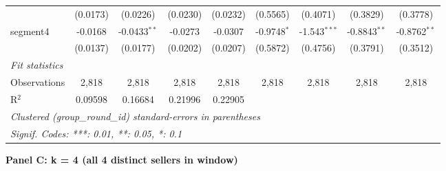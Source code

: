 \begin{tabular}{lcccccccc}
                                    & (0.0173)        & (0.0226)        & (0.0230)        & (0.0232)        & (0.5565)       & (0.4071)       & (0.3829)       & (0.3778)\\   
   segment4                         & -0.0168         & -0.0433$^{**}$  & -0.0273         & -0.0307         & -0.9748$^{*}$  & -1.543$^{***}$ & -0.8843$^{**}$ & -0.8762$^{**}$\\   
                                    & (0.0137)        & (0.0177)        & (0.0202)        & (0.0207)        & (0.5872)       & (0.4756)       & (0.3791)       & (0.3512)\\   
   \midrule
   \emph{Fit statistics}\\
   Observations                     & 2,818           & 2,818           & 2,818           & 2,818           & 2,818          & 2,818          & 2,818          & 2,818\\  
   R$^2$                            & 0.09598         & 0.16684         & 0.21996         & 0.22905         &                &                &                & \\  
   \midrule \midrule
   \multicolumn{9}{l}{\emph{Clustered (group\_round\_id) standard-errors in parentheses}}\\
   \multicolumn{9}{l}{\emph{Signif. Codes: ***: 0.01, **: 0.05, *: 0.1}}\\
\end{tabular}
\par\endgroup
\medskip
\textbf{Panel C: k = 4 (all 4 distinct sellers in window)}\\
\begingroup
\centering
\scriptsize
